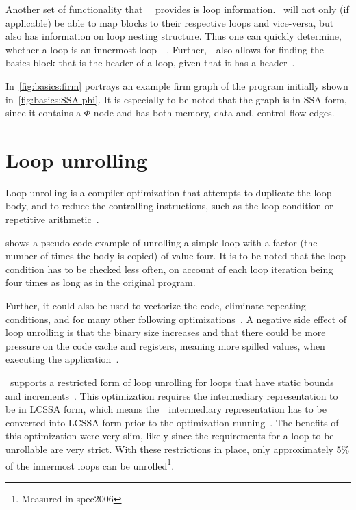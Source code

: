 Another set of functionality that~\libFIRM~ provides is loop information.
\libFIRM~will not only (if applicable) be able to map blocks to their respective loops and vice-versa, but also has information on loop nesting structure.
Thus one can quickly determine, whether a loop is an innermost loop~\libFIRM~\cite{libfirm}.
Further,~\libFIRM~also allows for finding the basics block that is the header of a loop, given that it has a header~\cite{aebi18bachelorarbeit}.

In~\cref{fig:basics:firm} portrays an example firm graph of the program initially shown in~\cref{fig:basics:SSA-phi}.
It is especially to be noted that the graph is in SSA form, since it contains a $\Phi$-node and has both memory, data and, control-flow edges.


\section{Loop unrolling}\label{sec:basics:unrolling}

Loop unrolling is a compiler optimization that attempts to duplicate the loop body, and to reduce the controlling instructions, such as the loop condition or repetitive arithmetic~\cite{aho_ullman_1979}.

 shows a pseudo code example of unrolling a simple loop with a factor (the number of times the body is copied) of value four.
It is to be noted that the loop condition has to be checked less often, on account of each loop iteration being four times as long as in the original program.

Further, it could also be used to vectorize the code, eliminate repeating conditions, and for many other following optimizations~\cite{fog_2018}.
A negative side effect of loop unrolling is that the binary size increases and that there could be more pressure on the code cache and registers, meaning more spilled values, when executing the application~\cite{Sarkar2001}.

\libFIRM~supports a restricted form of loop unrolling for loops that have static bounds and increments~\cite{aebi18bachelorarbeit}.
This optimization requires the intermediary representation to be in LCSSA form, which means the~\libFIRM~intermediary representation has to be converted into LCSSA form prior to the optimization running~\cite{aebi18bachelorarbeit}.
The benefits of this optimization were very slim, likely since the requirements for a loop to be unrollable are very strict.
With these restrictions in place, only approximately 5\% of the innermost loops can be unrolled\footnote{Measured in spec2006}.


